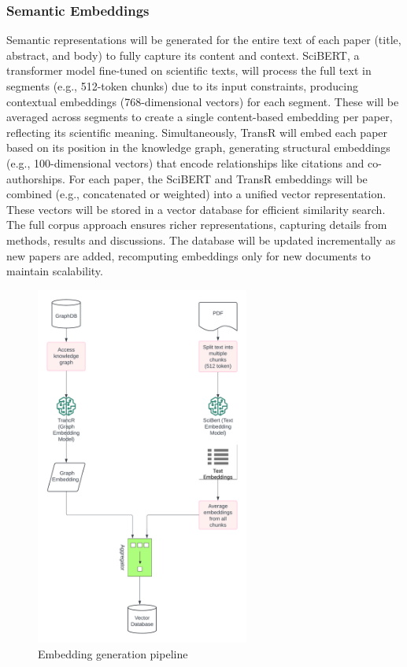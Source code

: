 \documentclass[a4paper,12pt]{article}
\begin{document}
\subsubsection{Semantic Embeddings}
Semantic representations will be generated for the entire text of each paper
(title, abstract, and body) to fully capture its content and context. SciBERT,
a transformer model fine-tuned on scientific texts, will process the full text
in segments (e.g., 512-token chunks) due to its input constraints, producing
contextual embeddings (768-dimensional vectors) for each segment. These will be
averaged across segments to create a single content-based embedding per paper,
reflecting its scientific meaning. Simultaneously, TransR will embed each paper
based on its position in the knowledge graph, generating structural embeddings
(e.g., 100-dimensional vectors) that encode relationships like citations and
co-authorships. For each paper, the SciBERT
\parencite{beltagy2019scibertpretrainedlanguagemodel} and TransR
\parencite{10.3233/JIFS-202177} embeddings will be combined (e.g., concatenated or
weighted) into a unified vector representation. These vectors will be stored in a
vector database for efficient similarity search. The full corpus approach ensures
richer representations, capturing details from methods, results and discussions.
The database will be updated incrementally as new papers are added, recomputing
embeddings only for new documents to maintain scalability.
\begin{figure}[H]
    \centering
    \includegraphics[width=7cm]{semanticembedding.png}
    \caption{Embedding generation pipeline}
\end{figure}
\newpage
\end{document}
